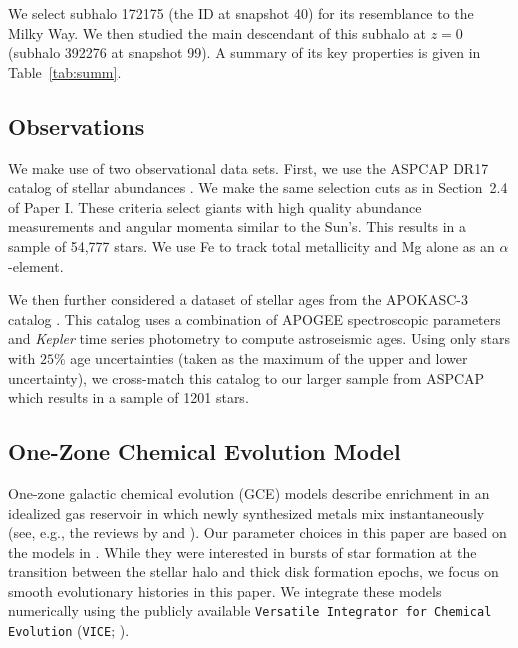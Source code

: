 \documentclass[twocolumn]{aastex631}
\begin{document}
We select subhalo 172175 (the ID at snapshot 40) for its resemblance to the Milky Way. We then studied the main descendant of this subhalo at $z=0$ (subhalo 392276 at snapshot 99). A summary of its key properties is given in Table~\ref{tab:summ}.

\subsection{Observations}\label{ssec:obs}
We make use of two observational data sets. First, we use the ASPCAP DR17 catalog of stellar abundances \citep[][J.A.~Holtzman et al., in preparation]{2016AJ....151..144G}. We make the same selection cuts as in Section~2.4 of Paper I. These criteria select giants with high quality abundance measurements and angular momenta similar to the Sun's. This results in a sample of 54,777 stars. We use Fe to track total metallicity and Mg alone as an $\alpha$-element.

We then further considered a dataset of stellar ages from the APOKASC-3 catalog \citep{2024arXiv241000102P}. This catalog uses a combination of APOGEE spectroscopic parameters and \textit{Kepler} time series photometry to compute astroseismic ages. Using only stars with $25\%$ age uncertainties (taken as the maximum of the upper and lower uncertainty), we cross-match this catalog to our larger sample from ASPCAP which results in a sample of 1201 stars.

\subsection{One-Zone Chemical Evolution Model}\label{ssec:onezone_met}
One-zone galactic chemical evolution (GCE) models describe enrichment in an idealized gas reservoir in which newly synthesized metals mix instantaneously (see, e.g., the reviews by \citealt{Tinsley1980} and \citealt{Matteucci2021}). Our parameter choices in this paper are based on the models in \citet{2022arXiv220402989C}. While they were interested in bursts of star formation at the transition between the stellar halo and thick disk formation epochs, we focus on smooth evolutionary histories in this paper. We integrate these models numerically using the publicly available {\tt Versatile Integrator for Chemical Evolution} ({\tt VICE}; \citealt{2020MNRAS.498.1364J}).
\end{document}
